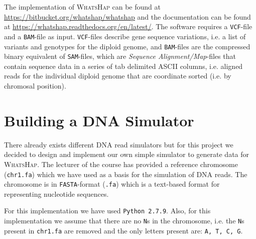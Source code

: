 \documentclass[10pt,a4paper]{article}
\begin{document}
The implementation of \textsc{WhatsHap} can be found at \url{https://bitbucket.org/whatshap/whatshap} and the documentation can be found at \url{https://whatshap.readthedocs.org/en/latest/}. The software requires a \texttt{VCF}-file and a \texttt{BAM}-file as input. \texttt{VCF}-files describe gene sequence variations, i.e. a list of variants and genotypes for the diploid genome, and \texttt{BAM}-files are the compressed binary equivalent of \texttt{SAM}-files, which are \textit{Sequence Alignment/Map}-files that contain sequence data in a series of tab delimited ASCII columns, i.e. aligned reads for the individual diploid genome that are coordinate sorted (i.e. by chromosal position).

\section{Building a DNA Simulator}
There already exists different DNA read simulators but for this project we decided to design and implement our own simple simulator to generate data for \textsc{WhatsHap}. The lecturer of the course has provided a reference chromosome (\texttt{chr1.fa}) which we have used as a basis for the simulation of DNA reads. The chromosome is in \texttt{FASTA}-format (\texttt{.fa}) which is a text-based format for representing nucleotide sequences.

For this implementation we have used \texttt{Python 2.7.9}. Also, for this implementation we assume that there are no \texttt{N}s in the chromosome, i.e. the \texttt{N}s present in \texttt{chr1.fa} are removed and the only letters present are: \texttt{A, T, C, G}.
\end{document}

